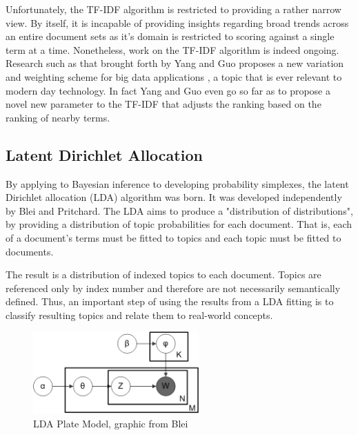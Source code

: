 \documentclass[conference]{IEEEtran}
\begin{document}
Unfortunately, the TF-IDF algorithm is restricted to providing a rather narrow view. By itself, it is incapable of providing insights regarding broad trends across an entire document sets as it's domain is restricted to scoring against a single term at a time. Nonetheless, work on the TF-IDF algorithm is indeed ongoing. Research such as that brought forth by Yang and Guo proposes a new variation and weighting scheme for big data applications \cite{7560393}, a topic that is ever relevant to modern day technology. In fact Yang and Guo even go so far as to propose a novel new parameter to the TF-IDF that adjusts the ranking based on the ranking of nearby terms.

\subsection{Latent Dirichlet Allocation}

By applying to Bayesian inference to developing probability simplexes, the latent Dirichlet allocation (LDA) algorithm was born. It was developed independently by Blei\cite{blei2003latent} and Pritchard\cite{pritchard2000inference}. The LDA aims to produce a "distribution of distributions", by providing a distribution of topic probabilities for each document. That is, each of a document's terms must be fitted to topics and each topic must be fitted to documents.

The result is a distribution of indexed topics to each document. Topics are referenced only by index number and therefore are not necessarily semantically defined. Thus, an important step of using the results from a LDA fitting is to classify resulting topics and relate them to real-world concepts.

\begin{figure}
	\centering
	\includegraphics[width=2.5in]{lda_plate_model.png}
	\caption{LDA Plate Model, graphic from Blei \cite{blei2003latent}}
	\label{fig:lda_plate_model}
\end{figure}
\end{document}
